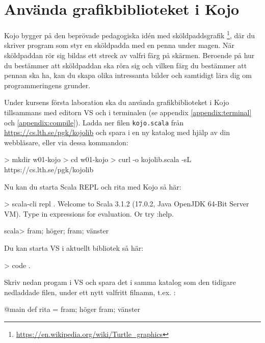 \section{Använda grafikbiblioteket i Kojo}\label{appendix:ide:kojo:install}

Kojo bygger på den beprövade pedagogiska idén med sköldpaddsgrafik \footnote{\url{https://en.wikipedia.org/wiki/Turtle_graphics}}, där du skriver program som styr en sköldpadda med en penna under magen. När sköldpaddan rör sig bildas ett streck av valfri färg på skärmen. Beroende på hur du bestämmer att sköldpaddan ska röra sig och vilken färg du bestämmer att pennan ska ha, kan du skapa olika intressanta bilder och samtidigt lära dig om programmeringens grunder.

Under kursens första laboration ska du använda grafikbiblioteket i Kojo tillsammans med editorn VS  och  i terminalen (se appendix \ref{appendix:terminal} och \ref{appendix:compile}). Ladda ner filen \texttt{kojo.scala} från \url{https://cs.lth.se/pgk/kojolib} och spara i en ny katalog med hjälp av din webbläsare, eller via dessa kommandon:

\begin{REPLnonum}
> mkdir w01-kojo
> cd w01-kojo
> curl -o kojolib.scala -sL https://cs.lth.se/pgk/kojolib
\end{REPLnonum}

Nu kan du starta Scala REPL och rita med Kojo så här:

\begin{REPLnonum}
> scala-cli repl .
Welcome to Scala 3.1.2 (17.0.2, Java OpenJDK 64-Bit Server VM).
Type in expressions for evaluation. Or try :help.
                                                                                                                               
scala> fram; höger; fram; vänster

\end{REPLnonum}

Du kan starta VS  i aktuellt bibliotek så här:
\begin{REPLnonum}
> code .
\end{REPLnonum}

Skriv nedan progam i VS  och spara det i samma katalog som den tidigare nedladdade filen, under ett nytt valfritt filnamn, t.ex. :

\begin{Code}
@main def rita =
  fram; höger
  fram; vänster
\end{Code}

